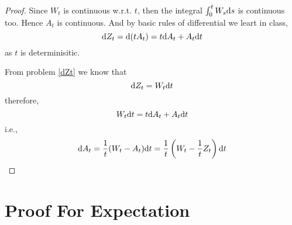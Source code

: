 \documentclass{homework}
\begin{document}
    \problem
    \begin{proof}
        Since $W_t$ is continuous w.r.t. $t$, then the
        integral $\int_0^tW_s\mathrm d s$ is continuous too.
        Hence $A_t$ is continuous. And by basic rules of
        differential we leart in class,
        \[\mathrm d Z_t=\mathrm d(tA_t)=t\mathrm d A_t+A_t\mathrm d t\]
        as $t$ is determinisitic.

        From problem \ref{dZt} we know that
        \[\mathrm d Z_t=W_t\mathrm d t\]
        therefore,
        \[W_t\mathrm d t=t\mathrm d A_t+A_t\mathrm d t\]
        i.e.,
        \[\mathrm d A_t=\frac{1}{t}(W_t-A_t)\mathrm d t
        =\frac{1}{t}\left(W_t-\frac{1}{t}Z_t\right)\mathrm d t\]
    \end{proof}

    \appendix
    \section{Proof For Expectation}
    \label{sec:proof for expectation}
\end{document}
